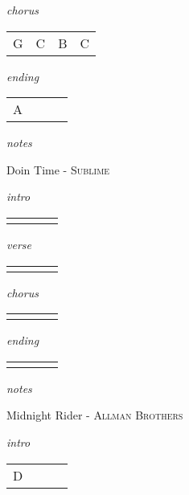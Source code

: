 \documentclass[12pt]{article}
\begin{document}
\textit{chorus}

\begin{tabular}{|P{1.25in}|P{1.25in}|P{1.25in}|P{1.25in}|}
  G & C  &  B &  C \\
\end{tabular}

\textit{ending}

\begin{tabular}{|P{1.25in}|P{1.25in}|P{1.25in}|P{1.25in}|}
  A &   &   &   \\
\end{tabular}

\textit{notes}

\newpage

{\Huge Doin Time} {\huge - \textsc{Sublime}}

\huge
\textit{intro}

\begin{tabular}{|P{1.25in}|P{1.25in}|P{1.25in}|P{1.25in}|}
    &   &   &   \\
\end{tabular}

\textit{verse}

\begin{tabular}{|P{1.25in}|P{1.25in}|P{1.25in}|P{1.25in}|}
    &   &   &   \\
\end{tabular}

\textit{chorus}

\begin{tabular}{|P{1.25in}|P{1.25in}|P{1.25in}|P{1.25in}|}
    &   &   &   \\
\end{tabular}

\textit{ending}

\begin{tabular}{|P{1.25in}|P{1.25in}|P{1.25in}|P{1.25in}|}
    &   &   &   \\
\end{tabular}

\textit{notes}

\newpage

{\Huge Midnight Rider} {\huge - \textsc{Allman Brothers}}

\huge
\textit{intro}

\begin{tabular}{|P{1.25in}|P{1.25in}|P{1.25in}|P{1.25in}|}
  D &   &   &   \\
\end{tabular}
\end{document}
